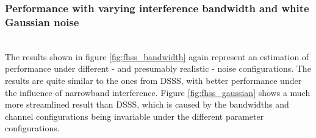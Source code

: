 		
		\subsubsection{Performance with varying interference bandwidth and white Gaussian noise}~\\
		
		The results shown in figure \ref{fig:fhss_bandwidth} again represent an estimation of performance under different - and presumably realistic - noise configurations. The results are quite similar to the ones from DSSS, with better performance under the influence of narrowband interference. Figure \ref{fig:fhss_gaussian} shows a much more streamlined result than DSSS, which is caused by the bandwidths and channel configurations being invariable under the different parameter configurations.
	
